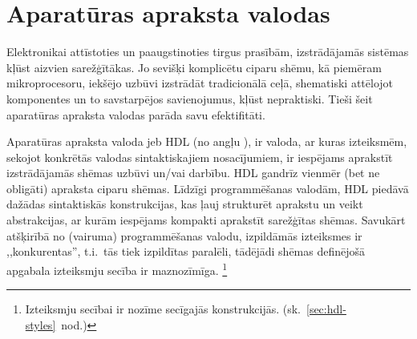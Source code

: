



\section{Aparatūras apraksta valodas}
Elektronikai attīstoties un paaugstinoties tirgus prasībām, izstrādājamās
sistēmas kļūst aizvien sarežģītākas. Jo sevišķi komplicētu ciparu shēmu, 
kā piemēram mikroprocesoru, iekšējo uzbūvi izstrādāt tradicionālā ceļā,
shematiski attēlojot komponentes un to savstarpējos savienojumus, kļūst
nepraktiski. Tieši šeit aparatūras apraksta valodas parāda savu efektifitāti.

Aparatūras apraksta valoda jeb HDL
(no angļu ),
ir valoda, ar kuras izteiksmēm, sekojot konkrētās 
valodas sintaktiskajiem nosa\-cī\-jumiem, ir iespējams aprakstīt
izstrādājamās shēmas uzbūvi un/vai darbību.\cite{HDL} %
HDL gandrīz vienmēr (bet ne obligāti) apraksta ciparu shēmas.
Līdzīgi program\-mē\-šanas valodām, HDL piedāvā dažādas sintaktiskās 
konstrukcijas, kas ļauj strukturēt aprakstu un veikt abstrakcijas,
ar kurām iespējams kompakti aprakstīt sarežģītas shēmas.%
\cite[1.~lpp.]{Perry-VHDL}
Savukārt atšķirībā no (vairuma) programmēšanas valodu,
izpildāmās izteiksmes ir ,,konkurentas'', t.i.~tās tiek izpildītas paralēli, 
tādējādi shēmas definējošā apgabala izteiksmju secība ir maznozīmīga.%
\footnote{Izteiksmju secībai ir nozīme secīgajās konstrukcijās.
	(sk.~\ref{sec:hdl-styles}~nod.)}

